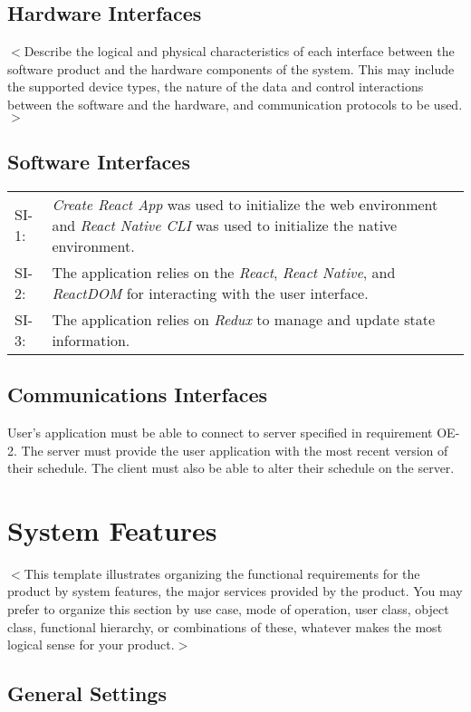 \documentclass{scrreprt}
\begin{document}
\section{Hardware Interfaces}
$<$Describe the logical and physical characteristics of each interface between
the software product and the hardware components of the system. This may include
the supported device types, the nature of the data and control interactions
between the software and the hardware, and communication protocols to be
used.$>$

\section{Software Interfaces}
\begin{center}
\begin{tabular}{  p{1cm}  p{13cm}  }
SI-1: & \textit{Create React App} was used to initialize the web environment and \textit{React Native CLI} was used to initialize the native environment.\\
SI-2: & The application relies on the \textit{React}, \textit{React Native}, and \textit{ReactDOM} for interacting with the user interface.\\
SI-3: & The application relies on \textit{Redux} to manage and update state information.
\end{tabular}
\end{center}

\section{Communications Interfaces}
User's application must be able to connect to server specified in requirement OE-2.
The server must provide the user application with the most recent version of their
schedule. The client must also be able to alter their schedule on the server.


\chapter{System Features}
$<$This template illustrates organizing the functional requirements for the
product by system features, the major services provided by the product. You may
prefer to organize this section by use case, mode of operation, user class,
object class, functional hierarchy, or combinations of these, whatever makes the
most logical sense for your product.$>$

\section{General Settings}
\end{document}
